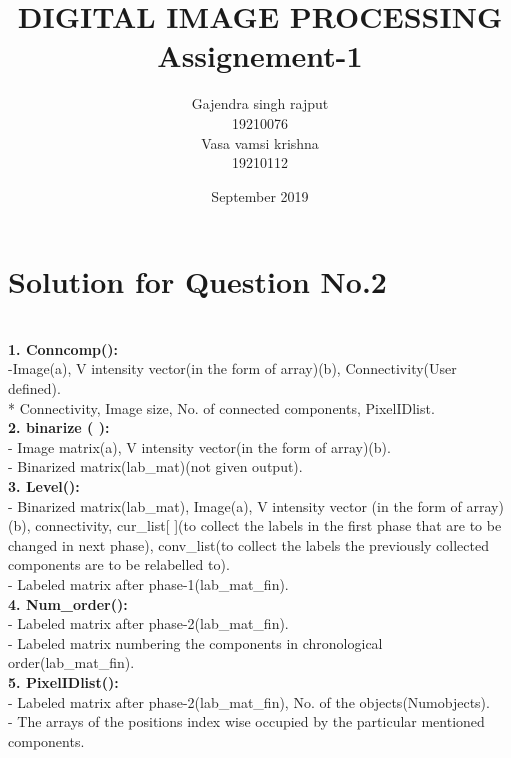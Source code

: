 \documentclass{report}
\title{{DIGITAL IMAGE PROCESSING}\\{
} 
Assignement-1}
\author{ Gajendra singh rajput\\
19210076\\ 
Vasa vamsi krishna\\ 
19210112}
\date{September 2019}
\begin{document}
\maketitle
\tableofcontents
\newpage

   \section {Solution for Question No.2}

\\

\noindent \textbf{1. Conncomp():}\\
 \textit{}-Image(a), V intensity vector(in the form of array)(b), Connectivity(User defined).
\\*{\textit{}} Connectivity, Image size, No. of connected components, PixelIDlist.\\
 
 \noindent \textbf{2. binarize ( ):}\\
\textit{}- Image matrix(a), V intensity vector(in the form of array)(b). \\
\textit{}- Binarized matrix(lab\_mat)(not given output).\\

\noindent \textbf{3. Level():}\\
\textit{}- Binarized matrix(lab\_mat), Image(a), V intensity vector (in the form of array)(b), connectivity, cur\_list[ ](to collect the labels in the first phase that are to be changed in next phase), conv\_list(to collect the labels the previously collected components are to be relabelled to).\\
\textit{}- Labeled matrix after phase-1(lab\_mat\_fin).\\

\noindent \textbf{4. Num\_order():}\\
\textit{} - Labeled matrix after phase-2(lab\_mat\_fin).\\
\textit{} - Labeled matrix numbering the components in chronological order(lab\_mat\_fin).\\

\noindent \textbf{5. PixelIDlist():}\\
\textit{} - Labeled matrix after phase-2(lab\_mat\_fin), No. of the objects(Numobjects).\\
\textit{} - The arrays of the positions index wise occupied by the particular mentioned components.\\
\end{document}
